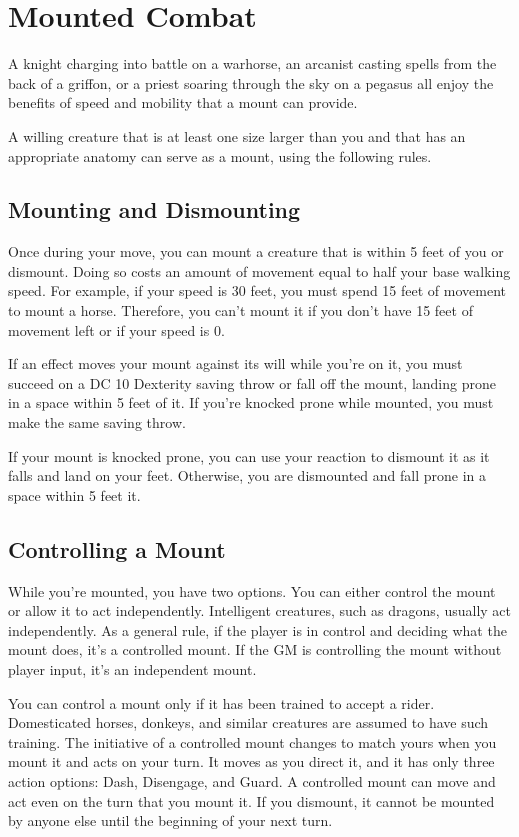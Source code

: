 \section{Mounted Combat}

A knight charging into battle on a warhorse, an arcanist casting spells from the back of a griffon, or a priest soaring through the sky on a pegasus all enjoy the benefits of speed and mobility that a mount can provide.

A willing creature that is at least one size larger than you and that has an appropriate anatomy can serve as a mount, using the following rules.

\subsection{Mounting and Dismounting}

Once during your move, you can mount a creature that is within 5 feet of you or dismount. Doing so costs an amount of movement equal to half your base walking speed. For example, if your speed is 30 feet, you must spend 15 feet of movement to mount a horse. Therefore, you can't mount it if you don't have 15 feet of movement left or if your speed is 0.

If an effect moves your mount against its will while you're on it, you must succeed on a DC 10 Dexterity saving throw or fall off the mount, landing prone in a space within 5 feet of it. If you're knocked prone while mounted, you must make the same saving throw.

If your mount is knocked prone, you can use your reaction to dismount it as it falls and land on your feet. Otherwise, you are dismounted and fall prone in a space within 5 feet it.

\subsection{Controlling a Mount}

While you're mounted, you have two options. You can either control the mount or allow it to act independently. Intelligent creatures, such as dragons, usually act independently. As a general rule, if the player is in control and deciding what the mount does, it's a controlled mount. If the GM is controlling the mount without player input, it's an independent mount.

You can control a mount only if it has been trained to accept a rider. Domesticated horses, donkeys, and similar creatures are assumed to have such training. The initiative of a controlled mount changes to match yours when you mount it and acts on your turn. It moves as you direct it, and it has only three action options: Dash, Disengage, and Guard. A controlled mount can move and act even on the turn that you mount it. If you dismount, it cannot be mounted by anyone else until the beginning of your next turn.

